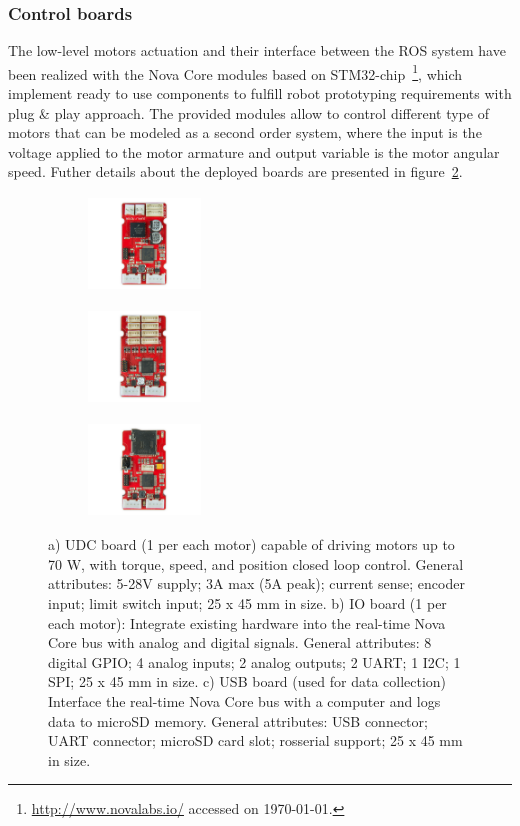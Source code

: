 \subsubsection{Control boards}\label{novacore}
The low-level motors actuation and their interface between the ROS system have been realized with the Nova Core modules based on STM32-chip~\footnote{\url{http://www.novalabs.io/} accessed on \today.}, which implement ready to use components to fulfill robot prototyping requirements with plug \& play approach.  
The provided modules allow to control different type of motors that can be modeled as a second order system, where the input is the voltage applied to the motor armature and output variable is the motor angular speed. Futher details about the deployed boards are presented in figure~\ref{fig:boards}.

\begin{figure}[ht]
  \centering
  \begin{subfigure}[b]{0.3\textwidth}
  \centering
      \includegraphics[width=3cm,height=2.5cm]{images/03-foundation/udc}
	\caption{}
  \end{subfigure}
  \begin{subfigure}[b]{0.3\textwidth}
  \centering
      \includegraphics[width=3cm,height=2.5cm]{images/03-foundation/io}
	\caption{}
  \end{subfigure}
  \begin{subfigure}[b]{0.3\textwidth}
  \centering
      \includegraphics[width=3cm,height=2.5cm]{images/03-foundation/usb}
	\caption{}
	\label{fig:usb_board}
  \end{subfigure}
  \caption{a) UDC board (1 per each motor) capable of driving motors up to 70 W, with torque, speed, and position closed loop control. General attributes: 5-28V supply; 3A max (5A peak); current sense; encoder input; limit switch input; 25 x 45 mm in size. b) IO board (1 per each motor): Integrate existing hardware into the real-time Nova Core bus with analog and digital signals. General attributes: 8 digital GPIO;  4 analog inputs; 2 analog outputs; 2 UART; 1 I2C; 1 SPI; 25 x 45 mm in size. c) USB board (used for data collection) Interface the real-time Nova Core bus with a computer and logs data to microSD memory. General attributes: USB connector;  UART connector; microSD card slot; rosserial support; 25 x 45 mm in size.}
  \label{fig:boards}
\end{figure}
